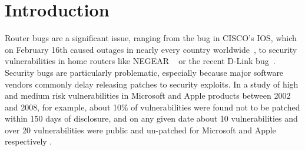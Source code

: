 \documentclass{sigcomm-alternate}
\begin{document}
\section{Introduction}
\label{sec-1}

Router bugs are a significant issue, ranging
from the bug in CISCO's IOS, which on February 16th caused outages in
nearly every country worldwide~\cite{biggest-router-bug}, to security
vulnerabilities in home routers like NEGEAR ~\cite{zcutlip} or the
recent D-Link bug~\cite{d-link}.  Security bugs are particularly
problematic, especially because major software vendors commonly delay
releasing patches to security exploits.  
In a study of high and medium risk vulnerabilities in Microsoft and
Apple products between 2002 and 2008, for example, about 10\% of
vulnerabilities were found not to be patched within 150 days of
disclosure, and on any given date about 10 vulnerabilities and over 20
vulnerabilities were public and un-patched for Microsoft and Apple
respectively \cite{frei20080}.



\end{document}
